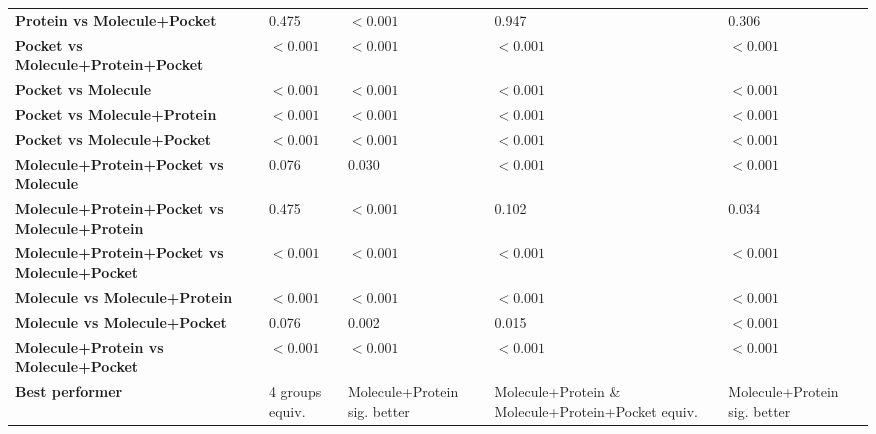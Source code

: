 \begin{table}[H]
{\begin{tabular}{lllll}
        \textbf{Protein vs Molecule+Pocket} & 0.475 & $< 0.001$ & 0.947 & 0.306 \\
        \textbf{Pocket vs Molecule+Protein+Pocket} & $< 0.001$ & $< 0.001$ & $< 0.001$ & $< 0.001$ \\
        \textbf{Pocket vs Molecule} & $< 0.001$ & $< 0.001$ & $< 0.001$ & $< 0.001$ \\
        \textbf{Pocket vs Molecule+Protein} & $< 0.001$ & $< 0.001$ & $< 0.001$ & $< 0.001$ \\
        \textbf{Pocket vs Molecule+Pocket} & $< 0.001$ & $< 0.001$ & $< 0.001$ & $< 0.001$ \\
        \textbf{Molecule+Protein+Pocket vs Molecule} & 0.076 & 0.030 & $< 0.001$ & $< 0.001$ \\
        \textbf{Molecule+Protein+Pocket vs Molecule+Protein} & 0.475 & $< 0.001$ & 0.102 & 0.034 \\
        \textbf{Molecule+Protein+Pocket vs Molecule+Pocket} & $< 0.001$ & $< 0.001$ & $< 0.001$ & $< 0.001$ \\
        \textbf{Molecule vs Molecule+Protein} & $< 0.001$ & $< 0.001$ & $< 0.001$ & $< 0.001$ \\
        \textbf{Molecule vs Molecule+Pocket} & 0.076 & 0.002 & 0.015 & $< 0.001$ \\
        \textbf{Molecule+Protein vs Molecule+Pocket} & $< 0.001$ & $< 0.001$ & $< 0.001$ & $< 0.001$ \\
        \textbf{Best performer} & 4 groups equiv. & Molecule+Protein sig. better & Molecule+Protein \& Molecule+Protein+Pocket equiv. & Molecule+Protein sig. better \\
        \bottomrule
    \end{tabular}}
\end{table}